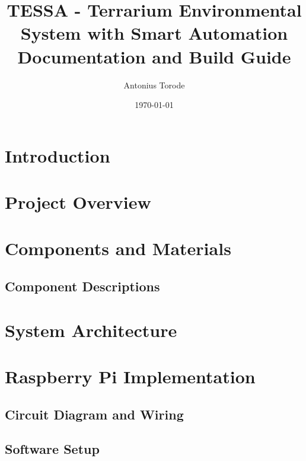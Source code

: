\documentclass{article}
\title{TESSA - Terrarium Environmental System with Smart Automation\\
	Documentation and Build Guide}
\author{Antonius Torode}
\date{\today}
\begin{document}
	
	\maketitle
	
	\tableofcontents
	
	\listoffigures %
	\listoftables %
	
	\begin{abstract}
		\lipsum[1]
	\end{abstract}
	
	\begin{multicols}{2} %
		
		\section{Introduction}
		\lipsum[2-4]
		
		\section{Project Overview}
		\lipsum[5-7]
		
		\section{Components and Materials}
		\lipsum[8-10]
		
		\subsection{Component Descriptions}
		\lipsum[11-13]
		
		\section{System Architecture}
		\lipsum[14-16]
		
		\section{Raspberry Pi Implementation}
		\lipsum[17-19]
		
		\subsection{Circuit Diagram and Wiring}
		\lipsum[20-22]
		
		\subsection{Software Setup}
		\lipsum[23-25]
		

\end{multicols}
\end{document}
